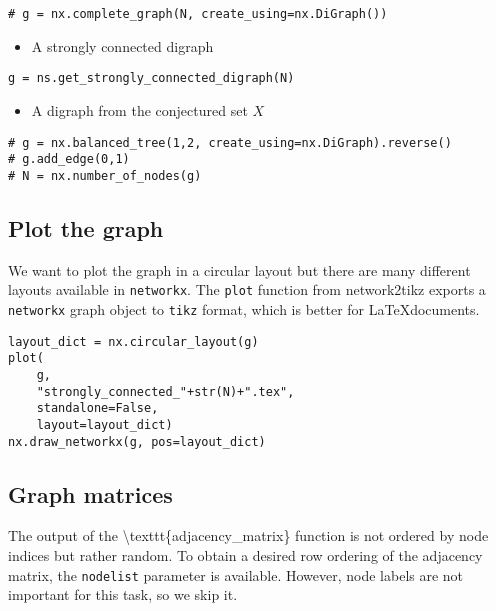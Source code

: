 \begin{verbatim}
# g = nx.complete_graph(N, create_using=nx.DiGraph())
\end{verbatim}

\begin{itemize}
\tightlist
\item
  A strongly connected digraph
\end{itemize}

\begin{verbatim}
g = ns.get_strongly_connected_digraph(N)
\end{verbatim}

\begin{itemize}
\tightlist
\item
  A digraph from the conjectured set \(X\)
\end{itemize}

\begin{verbatim}
# g = nx.balanced_tree(1,2, create_using=nx.DiGraph).reverse()
# g.add_edge(0,1)
# N = nx.number_of_nodes(g)
\end{verbatim}

\hypertarget{plot-the-graph}{%
\subsection{Plot the graph}\label{plot-the-graph}}

We want to plot the graph in a circular layout but there are many
different layouts available in \texttt{networkx}. The \texttt{plot}
function from network2tikz exports a \texttt{networkx} graph object to
\texttt{tikz} format, which is better for \LaTeX documents.

\begin{verbatim}
layout_dict = nx.circular_layout(g)
plot(
    g,
    "strongly_connected_"+str(N)+".tex", 
    standalone=False, 
    layout=layout_dict)
nx.draw_networkx(g, pos=layout_dict)
\end{verbatim}

\hypertarget{graph-matrices}{%
\subsection{Graph matrices}\label{graph-matrices}}

The output of the \textbackslash{}texttt\{adjacency\_matrix\} function
is not ordered by node indices but rather random. To obtain a desired
row ordering of the adjacency matrix, the \texttt{nodelist} parameter is
available. However, node labels are not important for this task, so we
skip it.

